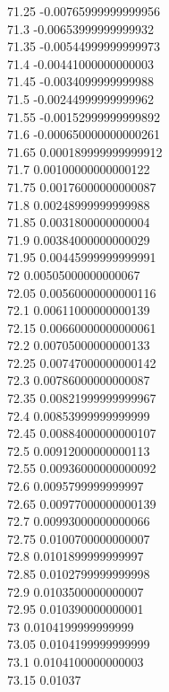 {71.25	-0.00765999999999956\\
71.3	-0.00653999999999932\\
71.35	-0.00544999999999973\\
71.4	-0.00441000000000003\\
71.45	-0.0034099999999988\\
71.5	-0.00244999999999962\\
71.55	-0.00152999999999892\\
71.6	-0.000650000000000261\\
71.65	0.000189999999999912\\
71.7	0.00100000000000122\\
71.75	0.00176000000000087\\
71.8	0.00248999999999988\\
71.85	0.0031800000000004\\
71.9	0.00384000000000029\\
71.95	0.00445999999999991\\
72	0.00505000000000067\\
72.05	0.00560000000000116\\
72.1	0.00611000000000139\\
72.15	0.00660000000000061\\
72.2	0.00705000000000133\\
72.25	0.00747000000000142\\
72.3	0.00786000000000087\\
72.35	0.00821999999999967\\
72.4	0.00853999999999999\\
72.45	0.00884000000000107\\
72.5	0.00912000000000113\\
72.55	0.00936000000000092\\
72.6	0.0095799999999997\\
72.65	0.00977000000000139\\
72.7	0.00993000000000066\\
72.75	0.0100700000000007\\
72.8	0.0101899999999997\\
72.85	0.0102799999999998\\
72.9	0.0103500000000007\\
72.95	0.010390000000001\\
73	0.0104199999999999\\
73.05	0.0104199999999999\\
73.1	0.0104100000000003\\
73.15	0.01037\\
}
